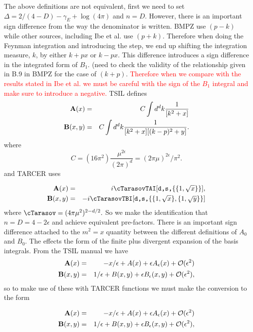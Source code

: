 \documentclass[11pt]{article}
\begin{document}
The above definitions are not equivalent, first we need to set $\Delta = 2/(4-D)-\gamma_E+\log(4\pi)$ and $n=D$.  However, there is an important sign difference from the way the denominator is written.  BMPZ use $(p-k)$ while other sources, including Ibe et al. use $(p+k)$.  Therefore when doing the Feynman integration and introducing the step, we end up shifting the integration measure, $k$, by either $k+px$ or $k-px$.  This difference introduces a sign difference in the integrated form of $B_1$.  (need to check the validity of the relationship given in B.9 in BMPZ for the case of $(k+p)$.  \textcolor{red}{Therefore when we compare with the results stated in Ibe et al. we must be careful with the sign of the $B_1$ integral and make sure to introduce a negative.}
TSIL defines
\begin{eqnarray}
{\bf A}(x) &=&  
C \int d^d k \frac{1}{[k^2 +x]}  %
\label{defineboldA}
\\
{\bf B}(x,y) &=&
C \int d^d k   \frac{1}{[k^2 +x] [(k-p)^2 +y]} .
\label{defineboldB}
\end{eqnarray}
where
\begin{equation}
C = (16 \pi^2) \frac{\mu^{2\epsilon}}{(2 \pi)^d}
  = (2 \pi \mu)^{2 \epsilon}/\pi^2 .
\end{equation}
and TARCER uses

\begin{eqnarray}
{\bf A}(x) &=& i \cTarasov \mbox{{\tt TAI$[$d,s,$\{\{1,\sqrt{x}\}\}]$}},
\\
{\bf B}(x,y) &=& -i \cTarasov \mbox{{\tt TBI$[$d,s,$\{%
\{1,\sqrt{x}\},\{1,\sqrt{y}\}\}]$}} 
\end{eqnarray}
where 
$
\cTarasov = (4 \pi \mu^2)^{2-d/2}.
$
So we make the identification that $n=D=4-2\epsilon$ and achieve equivalent pre-factors.  There is an important sign difference attached to the $m^2=x$ quantity between the different definitions of $A_0$ and $B_0$.  The effects the form of the finite plus divergent expansion of the basis integrals.  From the TSIL manual we have
\begin{eqnarray}
{\bf A}(x) &=& -x/\epsilon + A(x) + \epsilon A_\epsilon(x) + 
{\cal O}(\epsilon^2) 
\\
{\bf B}(x,y) &=& 1/\epsilon + B(x,y) + \epsilon B_\epsilon(x,y) 
+ {\cal O}(\epsilon^2) ,
\end{eqnarray}
so to make use of these with TARCER functions we must make the conversion to the form

\begin{eqnarray}
{\bf A}(x) &=& -x/\epsilon + A(x) + \epsilon A_\epsilon(x) + 
{\cal O}(\epsilon^2) 
\\
{\bf B}(x,y) &=& 1/\epsilon + B(x,y) + \epsilon B_\epsilon(x,y) 
+ {\cal O}(\epsilon^2) ,
\end{eqnarray}
\end{document}
